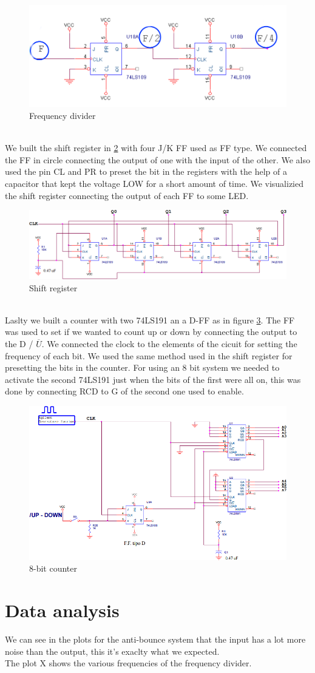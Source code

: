 \begin{figure}[H]
\centering
\includegraphics[width=.7\textwidth]{11/f_div.png}
\caption{Frequency divider}\label{f_div}
\end{figure}\\
We built the shift register in \ref{shift_reg} with four J/K FF used as FF type. We connected the FF in circle connecting the output of one with the input of the other. We also used the pin CL and PR to preset the bit in the registers with the help of a capacitor that kept the voltage LOW for a short amount of time. We visualizied the shift register connecting the output of each FF to some LED.
\begin{figure}[H]
\centering
\includegraphics[width=.7\textwidth]{11/shift_reg.png}
\caption{Shift register}\label{shift_reg}

\end{figure}\\
Laslty we built a counter with two 74LS191 an a D-FF as in figure \ref{count}. The FF was  used to set if we wanted to count up or down by connecting the output to the D / $\overline{U}$. We connected the clock to the elements of the cicuit for  setting the frequency of each bit. We used the same method used in the shift register for presetting the bits in the counter. For using an 8 bit system we needed to activate the second 74LS191 just when the bits of the first were all on, this was done by connecting RCD to G of the second one used to enable.
\begin{figure}[H]
\centering
\includegraphics[width=.7\textwidth]{11/count.png}
\caption{8-bit counter}\label{count}
\end{figure}
\section{Data analysis}
We can see in the plots for the anti-bounce system that the input has a lot more noise than the output, this it's exaclty what we expected.\\
The plot X shows the various frequencies of the frequency divider.\\
